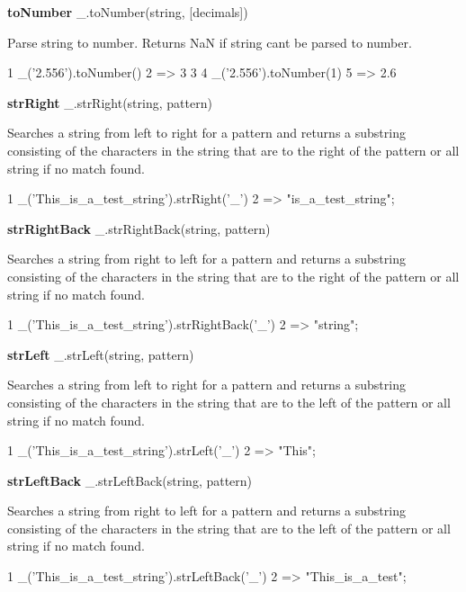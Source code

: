 {\bfseries to\+Number} \+\_\+.\+to\+Number(string, \mbox{[}decimals\mbox{]})

Parse string to number. Returns Na\+N if string can\textquotesingle{}t be parsed to number.


\begin{DoxyCode}
1 \_('2.556').toNumber()
2 => 3
3 
4 \_('2.556').toNumber(1)
5 => 2.6
\end{DoxyCode}


{\bfseries str\+Right} \+\_\+.\+str\+Right(string, pattern)

Searches a string from left to right for a pattern and returns a substring consisting of the characters in the string that are to the right of the pattern or all string if no match found.


\begin{DoxyCode}
1 \_('This\_is\_a\_test\_string').strRight('\_')
2 => "is\_a\_test\_string";
\end{DoxyCode}


{\bfseries str\+Right\+Back} \+\_\+.\+str\+Right\+Back(string, pattern)

Searches a string from right to left for a pattern and returns a substring consisting of the characters in the string that are to the right of the pattern or all string if no match found.


\begin{DoxyCode}
1 \_('This\_is\_a\_test\_string').strRightBack('\_')
2 => "string";
\end{DoxyCode}


{\bfseries str\+Left} \+\_\+.\+str\+Left(string, pattern)

Searches a string from left to right for a pattern and returns a substring consisting of the characters in the string that are to the left of the pattern or all string if no match found.


\begin{DoxyCode}
1 \_('This\_is\_a\_test\_string').strLeft('\_')
2 => "This";
\end{DoxyCode}


{\bfseries str\+Left\+Back} \+\_\+.\+str\+Left\+Back(string, pattern)

Searches a string from right to left for a pattern and returns a substring consisting of the characters in the string that are to the left of the pattern or all string if no match found.


\begin{DoxyCode}
1 \_('This\_is\_a\_test\_string').strLeftBack('\_')
2 => "This\_is\_a\_test";
\end{DoxyCode}


